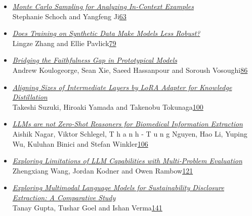 \documentclass[11pt,oneside]{book}
\begin{document}
\begin{itemize}[leftmargin=*,label={}]
       \item \hyperlink{page.63}{\emph{Monte Carlo Sampling for Analyzing In-Context Examples}}\\ \hspace*{2em} Stephanie Schoch and Yangfeng Ji\dotfill \hyperlink{page.63}{63}
       \item \hyperlink{page.79}{\emph{Does Training on Synthetic Data Make Models Less Robust?}}\\ \hspace*{2em} Lingze Zhang and Ellie Pavlick\dotfill \hyperlink{page.79}{79}
       \item \hyperlink{page.86}{\emph{Bridging the Faithfulness Gap in Prototypical Models}}\\ \hspace*{2em} Andrew Koulogeorge, Sean Xie, Saeed Hassanpour and Soroush Vosoughi\dotfill \hyperlink{page.86}{86}
       \item \hyperlink{page.100}{\emph{Aligning Sizes of Intermediate Layers by LoRA Adapter for Knowledge Distillation}}\\ \hspace*{2em} Takeshi Suzuki, Hiroaki Yamada and Takenobu Tokunaga\dotfill \hyperlink{page.100}{100}
       \item \hyperlink{page.106}{\emph{LLMs are not Zero-Shot Reasoners for Biomedical Information Extraction}}\\ \hspace*{2em} Aishik Nagar, Viktor Schlegel, T h a n h - T u n g Nguyen, Hao Li, Yuping Wu, Kuluhan Binici and Stefan Winkler\dotfill \hyperlink{page.106}{106}
       \item \hyperlink{page.121}{\emph{Exploring Limitations of LLM Capabilities with Multi-Problem Evaluation}}\\ \hspace*{2em} Zhengxiang Wang, Jordan Kodner and Owen Rambow\dotfill \hyperlink{page.121}{121}
       \item \hyperlink{page.141}{\emph{Exploring Multimodal Language Models for Sustainability Disclosure Extraction: A Comparative Study}}\\ \hspace*{2em} Tanay Gupta, Tushar Goel and Ishan Verma\dotfill \hyperlink{page.141}{141}

\end{itemize}
\end{document}
